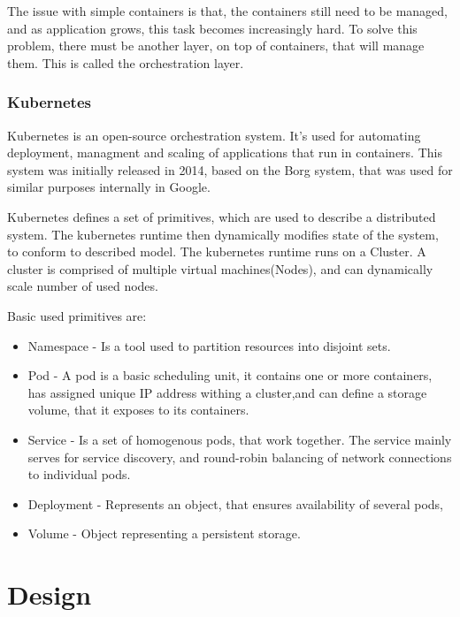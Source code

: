 The issue with simple containers is that, the containers still need to be managed, and as application
grows, this task becomes increasingly hard. To solve this problem, there must be another layer, on top of containers,
that will manage them. This is called the orchestration layer.

\subsection{Kubernetes}

Kubernetes\cite{web:k8s} is an open-source orchestration system. It's used for automating
deployment, managment and scaling of applications that run in containers. This system was initially released in 2014,
based on the Borg\cite{borg} system, that was used for similar purposes internally in Google.

Kubernetes defines a set of primitives, which are used to describe a distributed system. The kubernetes
runtime then dynamically modifies state of the system, to conform to described model. The kubernetes runtime
runs on a Cluster. A cluster is comprised of multiple virtual machines(Nodes), and can dynamically scale number
of used nodes.

Basic used primitives are:
\begin{itemize}
    \item Namespace - Is a tool used to partition resources into disjoint sets.
    \item Pod - A pod is a basic scheduling unit, it contains one or more containers, has assigned unique IP address
    withing a cluster,and can define a storage volume, that it exposes to its containers.
    \item Service - Is a set of homogenous pods, that work together. The service mainly serves for service
    discovery, and round-robin balancing of network connections to individual pods.
    \item Deployment - Represents an object, that ensures availability of several pods,
    \item Volume - Object representing a persistent storage.
\end{itemize}


\chapter{Design}
\label{chapter:design}

